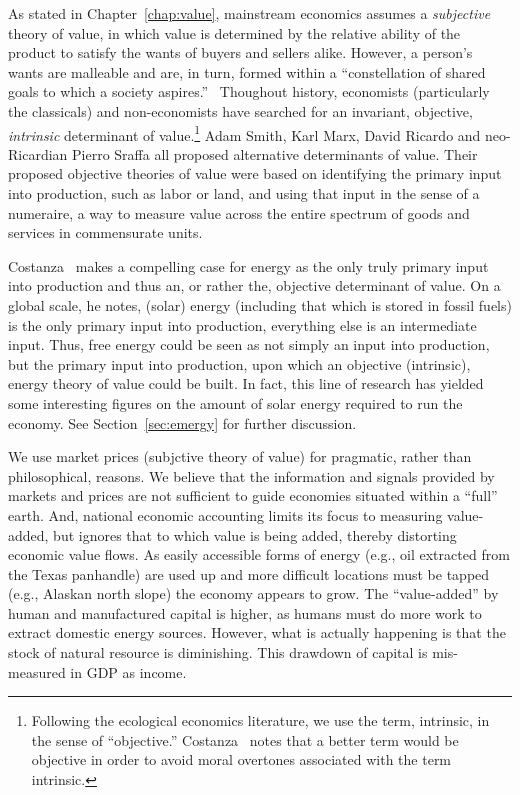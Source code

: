 As stated in Chapter~\ref{chap:value}, mainstream economics assumes a
\emph{subjective} theory of value, 
in which value is determined by the relative ability 
of the product to satisfy the wants of buyers and sellers alike.
However, a person’s wants are malleable and are, in turn, formed within a 
``constellation of shared goals to which a society aspires.''~\cite{Costanza:2004we}
Thoughout history, economists (particularly the classicals) 
and non-economists have searched for an invariant, objective, 
\emph{intrinsic} determinant of value.\footnote{Following the ecological economics literature, 
we use the term, intrinsic, in the sense of ``objective.'' Costanza~\cite{Costanza:2004we} 
notes that a better term would be objective in order to avoid moral overtones associated 
with the term intrinsic.} 
Adam Smith, Karl Marx, David Ricardo and neo-Ricardian Pierro Sraffa all proposed 
alternative determinants of value.  
Their proposed objective theories of value were based 
on identifying the primary input into production,
such as labor or land, and using that input in the sense of a numeraire, 
a way to measure value across the entire spectrum 
of goods and services in commensurate units.

Costanza~\cite{Costanza:2004we} makes a compelling case for energy 
as the only truly primary input into production 
and thus an, or rather the, objective determinant of value. 
On a global scale, he notes, (solar) energy 
(including that which is stored in fossil fuels) is the only primary input into production, 
everything else is an intermediate input. 
Thus, free energy could be seen as not simply an input into production, 
but the primary input into production, upon which an objective (intrinsic), 
energy theory of value could be built. 
In fact, this line of research has yielded some interesting figures on the amount 
of solar energy required to run the economy. 
See Section~\ref{sec:emergy} for further discussion.

We use market prices (subjctive theory of value) for pragmatic, 
rather than philosophical, reasons.
We believe that the information and signals provided by markets and prices 
are not sufficient to guide economies situated within a ``full'' earth.
And, national economic accounting limits its focus to measuring value-added, 
but ignores that to which value is being added,
thereby distorting economic value flows. 
As easily accessible forms of energy (e.g.,  oil extracted from the Texas panhandle) 
are used up and more difficult locations must be tapped (e.g., Alaskan north slope) 
the economy appears to grow.
The ``value-added'' by human and manufactured capital is higher, 
as humans must do more work to extract domestic energy sources. 
However, what is actually happening is that the stock 
of natural resource is diminishing. 
This drawdown of capital is mis-measured in GDP as income.~\cite[p. 66, 75]{Daly1997}

